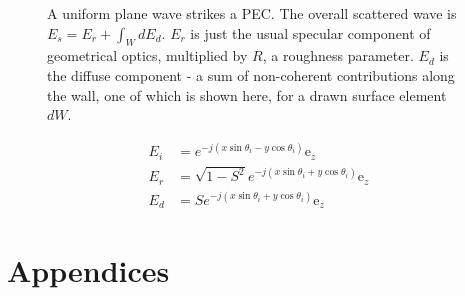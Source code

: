 \documentclass{article}
\numberwithin{equation}{section}
\begin{document}
\begin{figure}[H]
\begin{center}
            \caption{A uniform plane wave strikes a PEC. The overall scattered wave is
            $E_s = E_r + \int_W d E_d$. $E_r$ is just the usual specular component of
            geometrical optics, multiplied by $R$, a roughness parameter. $E_d$ is the
            diffuse component - a sum of non-coherent contributions along the wall, one
            of which is shown here, for a drawn surface element $dW$.}
            \label{fig:planeWavePEC}
            \end{center}
            \end{figure}

            \begin{subequations}
                \begin{align}
                    E_i &= e^{-j(x \sin \theta_i - y \cos \theta_i)} \text{e}_z \\
                    E_r &= \sqrt{1 - S^{2}} e^{-j(x \sin \theta_i + y \cos \theta_i)} \text{e}_z \\
                    E_d &= S e^{-j(x \sin \theta_i + y \cos \theta_i)} \text{e}_z
                \end{align}
            \end{subequations}
    \newpage
    \renewcommand{\thesubsection}{\Alph{subsection}}
    \appendix
    \section*{Appendices}
\end{document}
